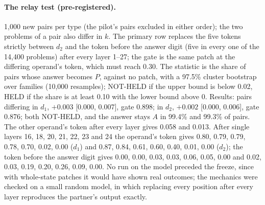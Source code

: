 \documentclass{article}
\begin{document}
\paragraph{The relay test (pre-registered).} 1,000 new pairs per type (the pilot's pairs excluded in either order); the two problems of a pair also differ in $k$. The primary row replaces the five tokens strictly between $d_2$ and the token before the answer digit (five in every one of the 14,400 problems) after every layer 1--27; the gate is the same patch at the differing operand's token, which must reach 0.30. The statistic is the share of pairs whose answer becomes $P$, against no patch, with a 97.5\% cluster bootstrap over families (10,000 resamples); NOT-HELD if the upper bound is below 0.02, HELD if the share is at least 0.10 with the lower bound above 0. Results: pairs differing in $d_1$, $+0.003$ [0.000, 0.007], gate 0.898; in $d_2$, $+0.002$ [0.000, 0.006], gate 0.876; both NOT-HELD, and the answer stays $A$ in 99.4\% and 99.3\% of pairs. The other operand's token after every layer gives 0.058 and 0.013. After single layers 16, 18, 20, 21, 22, 23 and 24 the operand's token gives 0.80, 0.79, 0.79, 0.78, 0.70, 0.02, 0.00 ($d_1$) and 0.87, 0.84, 0.61, 0.60, 0.40, 0.01, 0.00 ($d_2$); the token before the answer digit gives 0.00, 0.00, 0.03, 0.03, 0.06, 0.05, 0.00 and 0.02, 0.03, 0.19, 0.20, 0.26, 0.09, 0.00. No run on the model preceded the freeze, since with whole-state patches it would have shown real outcomes; the mechanics were checked on a small random model, in which replacing every position after every layer reproduces the partner's output exactly.
\end{document}
